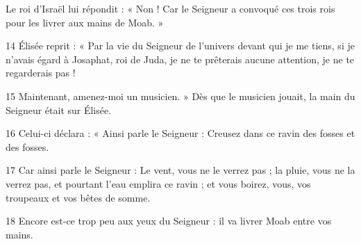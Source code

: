  Le roi d’Israël lui répondit : « Non ! Car le Seigneur a convoqué ces trois rois pour les livrer aux mains de Moab. »

14 Élisée reprit : « Par la vie du Seigneur de l’univers devant qui je me tiens, si je n’avais égard à Josaphat, roi de Juda, je ne te prêterais aucune attention, je ne te regarderais pas !

15 Maintenant, amenez-moi un musicien. » Dès que le musicien jouait, la main du Seigneur était sur Élisée.

16 Celui-ci déclara : « Ainsi parle le Seigneur : Creusez dans ce ravin des fosses et des fosses.

17 Car ainsi parle le Seigneur : Le vent, vous ne le verrez pas ; la pluie, vous ne la verrez pas, et pourtant l’eau emplira ce ravin ; et vous boirez, vous, vos troupeaux et vos bêtes de somme.

18 Encore est-ce trop peu aux yeux du Seigneur : il va livrer Moab entre vos mains.
